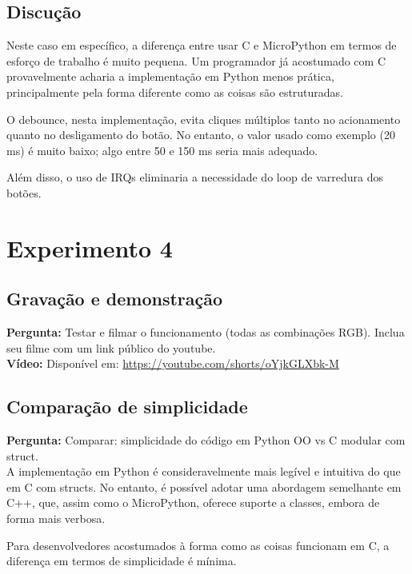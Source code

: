 \documentclass{article}
\begin{document}
\subsection{Discução}

Neste caso em específico, a diferença entre usar C e MicroPython em termos de esforço de trabalho é muito pequena. Um programador já acostumado com C provavelmente acharia a implementação em Python menos prática, principalmente pela forma diferente como as coisas são estruturadas.

O debounce, nesta implementação, evita cliques múltiplos tanto no acionamento quanto no desligamento do botão. No entanto, o valor usado como exemplo (20 ms) é muito baixo; algo entre 50 e 150 ms seria mais adequado.

Além disso, o uso de IRQs eliminaria a necessidade do loop de varredura dos botões.

\section{Experimento 4}

\subsection{Gravação e demonstração}

\noindent
\textbf{Pergunta:} Testar e filmar o funcionamento (todas as combinações RGB). Inclua seu filme com um link público do youtube. \\

\noindent
\textbf{Vídeo:} Disponível em: \url{https://youtube.com/shorts/oYjkGLXbk-M}

\subsection{Comparação de simplicidade}

\noindent
\textbf{Pergunta:} Comparar: simplicidade do código em Python OO vs C modular com struct. \\

\noindent
A implementação em Python é consideravelmente mais legível e intuitiva do que em C com structs. No entanto, é possível adotar uma abordagem semelhante em C++, que, assim como o MicroPython, oferece suporte a classes, embora de forma mais verbosa.

Para desenvolvedores acostumados à forma como as coisas funcionam em C, a diferença em termos de simplicidade é mínima. \\
\end{document}
